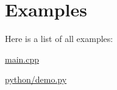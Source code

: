 \section{Examples}
Here is a list of all examples\+:\begin{DoxyCompactItemize}
\item 
\hyperlink{main_8cpp-example}{main.\+cpp}
\item 
\hyperlink{python_2demo_8py-example}{python/demo.\+py}
\end{DoxyCompactItemize}
